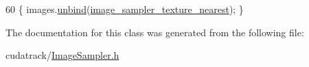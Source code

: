 \begin{DoxyCode}
60 \{ images.\hyperlink{structcuda_image_list_a5fd1e6014eb7f4a91e04344e208c70fe}{unbind}(\hyperlink{_image_sampler_8h_a7de6f4af580ecfe3df9ef9e65faac7e8}{image\_sampler\_texture\_nearest});  \}
\end{DoxyCode}


The documentation for this class was generated from the following file\+:\begin{DoxyCompactItemize}
\item 
cudatrack/\hyperlink{_image_sampler_8h}{Image\+Sampler.\+h}\end{DoxyCompactItemize}
